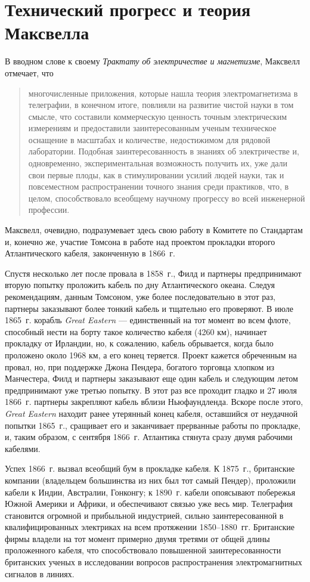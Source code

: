 \documentclass[12pt, oneside, a4paper]{article}
\begin{document}
\section{Технический прогресс и теория Максвелла}
В вводном слове к своему \emph{Трактату об электричестве и магнетизме}, Максвелл отмечает, что 
\begin{quote}
\small
многочисленные приложения, которые нашла теория электромагнетизма в телеграфии, в конечном итоге, повлияли на развитие чистой науки в том смысле, что составили коммерческую ценность точным электрическим измерениям и предоставили заинтересованным ученым техническое оснащение в масштабах и количестве, недостижимом для рядовой лаборатории. Подобная заинтересованность в знаниях об электричестве и, одновременно, экспериментальная возможность получить их, уже дали свои первые плоды, как в стимулировании усилий людей науки, так и повсеместном распространении точного знания среди практиков, что, в целом, способствовало  всеобщему научному прогрессу во всей инженерной профессии.
\end{quote}
Максвелл, очевидно, подразумевает здесь свою работу в Комитете по Стандартам и, конечно же, участие Томсона в работе над проектом прокладки второго Атлантического кабеля, законченную в 1866~г.

Спустя несколько лет после провала в 1858~г., Филд и партнеры предпринимают вторую попытку проложить кабель по дну Атлантического океана. Следуя рекомендациям, данным Томсоном, уже более последовательно в этот раз, партнеры заказывают более тонкий кабель и тщательно его проверяют. В июле 1865~г. корабль \emph{Great Eastern} --- единственный на тот момент во всем флоте, способный нести на борту такое количество кабеля (4260 км), начинает прокладку от Ирландии, но, к сожалению, кабель обрывается, когда было проложено около 1968 км, а его конец теряется. Проект кажется обреченным на провал, но, при поддержке Джона Пендера, богатого торговца хлопком из Манчестера, Филд и партнеры заказывают еще один кабель и следующим летом предпринимают уже третью попытку. В этот раз все проходит гладко и 27 июля 1866~г. партнеры закрепляют кабель вблизи Ньюфаундленда. Вскоре после этого, \emph{Great Eastern} находит ранее утерянный конец кабеля, оставшийся от неудачной попытки 1865~г., сращивает его и заканчивает прерванные работы по прокладке, и, таким образом, с сентября 1866~г. Атлантика стянута сразу двумя рабочими кабелями.

Успех 1866~г. вызвал всеобщий бум в прокладке кабеля. К 1875~г., британские компании (владельцем большинства из них был тот самый Пендер), проложили кабели к Индии, Австралии, Гонконгу; к 1890~г. кабели опоясывают побережья Южной Америки и Африки, и обеспечивают связью уже весь мир. Телеграфия становится огромной и прибыльной индустрией, сильно заинтересованной в квалифицированных электриках на всем протяжении 1850--1880~гг. Британские фирмы владели на тот момент примерно двумя третями от общей длины проложенного кабеля, что способствовало повышенной заинтересованности британских ученых в исследовании вопросов распространения электромагнитных сигналов в линиях.
\end{document}
